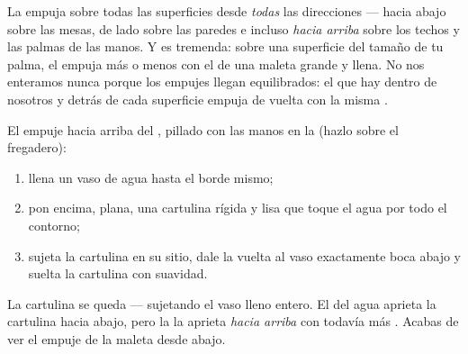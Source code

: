 \begin{proposition}\label{prop:g5:air-pressure-weather:allsides}
La  empuja sobre todas las superficies desde
\emph{todas} las direcciones --- hacia abajo sobre las mesas, de lado
sobre las paredes e incluso \emph{hacia arriba} sobre los techos y las
palmas de las manos. Y es tremenda: sobre una superficie del tamaño de
tu palma, el  empuja más o menos con el  de una maleta
grande y llena. No nos enteramos nunca porque los empujes llegan
equilibrados: el  que hay dentro de nosotros y detrás de cada
superficie empuja de vuelta con la misma .
\end{proposition}

\begin{method}\label{met:g5:air-pressure-weather:card}
El empuje hacia arriba del , pillado con las manos en la 
(hazlo sobre el fregadero):
\begin{enumerate}
  \item llena un vaso de agua hasta el borde mismo;
  \item pon encima, plana, una cartulina rígida y lisa que toque el
        agua por todo el contorno;
  \item sujeta la cartulina en su sitio, dale la vuelta al vaso
        exactamente boca abajo y suelta la cartulina con suavidad.
\end{enumerate}
La cartulina se queda --- sujetando el vaso lleno entero. El 
del agua aprieta la cartulina hacia abajo, pero la  la
aprieta \emph{hacia arriba} con todavía más . Acabas de ver el
empuje de la maleta desde abajo.
\end{method}

